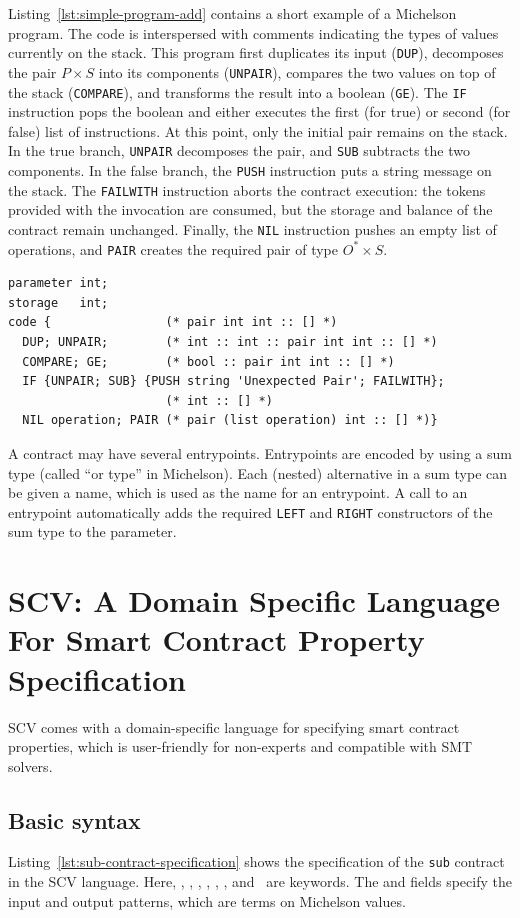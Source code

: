 \documentclass[runningheads]{llncs}
\begin{document}
Listing~\ref{lst:simple-program-add} contains a short example of a Michelson program. The code is interspersed with comments indicating the types of values currently on the stack. This program first duplicates its input (\lstinline|DUP|), decomposes the pair $P \times S$ into its components (\lstinline|UNPAIR|), compares the two values on top of the stack (\lstinline|COMPARE|), and transforms the result into a boolean (\lstinline|GE|). The \lstinline|IF| instruction pops the boolean and either executes the first (for true) or second (for false) list of instructions. At this point, only the initial pair remains on the stack. In the true branch, \lstinline|UNPAIR| decomposes the pair, and \lstinline|SUB| subtracts the two components. In the false branch, the \lstinline|PUSH| instruction puts a string message on the stack. The \lstinline|FAILWITH| instruction aborts the contract execution: the tokens provided with the invocation are consumed, but the storage and balance of the contract remain unchanged. Finally, the \lstinline|NIL| instruction pushes an empty list of operations, and \lstinline|PAIR| creates the required pair of type $O^* \times S$.
\lstset{language=michelson}
\begin{lstlisting}[float,captionpos=b,caption={A Michelson program},label={lst:simple-program-add}]
parameter int;
storage   int;
code {                (* pair int int :: [] *)
  DUP; UNPAIR;        (* int :: int :: pair int int :: [] *) 
  COMPARE; GE;        (* bool :: pair int int :: [] *)
  IF {UNPAIR; SUB} {PUSH string 'Unexpected Pair'; FAILWITH};
                      (* int :: [] *)
  NIL operation; PAIR (* pair (list operation) int :: [] *)}
\end{lstlisting}

A contract may have several entrypoints. Entrypoints are encoded by
using a sum type (called ``or type'' in Michelson). Each (nested)
alternative in a sum type can be
given a name, which is used as the name for an entrypoint. A call to
an entrypoint automatically adds the required \lstinline|LEFT| and
\lstinline|RIGHT| constructors of the sum type to the parameter.
\section{SCV: A Domain Specific Language For Smart Contract Property Specification}
\label{sec:domain-specific-language}
SCV comes with a domain-specific language for specifying smart
contract properties, which is user-friendly for non-experts and compatible with SMT solvers. 
\subsection{Basic syntax}
\label{sec:basic-syntax}
Listing~\ref{lst:sub-contract-specification} shows the specification of the \texttt{sub} contract in the SCV language. Here, \KMCONTRACT, \KSPEC, \KCODE, \KINPUT, \KOUTPUT, \KPRECONDI, and \KPOSTCONDI\ are keywords. The \KINPUT{} and \KOUTPUT{} fields specify the input and output patterns, which are terms on Michelson values.
\end{document}
